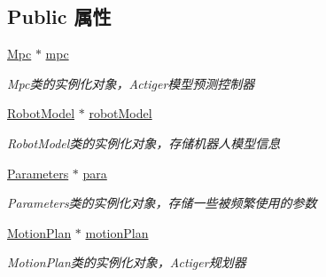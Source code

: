 \subsection*{Public 属性}
\begin{DoxyCompactItemize}
\item 
\mbox{\label{classquadruped_1_1LocomotionCtrl_af2e5cc2d85c00e73c580aebf5b6db19f}} 
\hyperlink{classquadruped_1_1Mpc}{Mpc} $\ast$ \hyperlink{classquadruped_1_1LocomotionCtrl_af2e5cc2d85c00e73c580aebf5b6db19f}{mpc}
\begin{DoxyCompactList}\small\item\em Mpc类的实例化对象，\+Actiger模型预测控制器 \end{DoxyCompactList}\item 
\mbox{\label{classquadruped_1_1LocomotionCtrl_afb4fdfa9aeafca4990b964be1760a291}} 
\hyperlink{classquadruped_1_1RobotModel}{Robot\+Model} $\ast$ \hyperlink{classquadruped_1_1LocomotionCtrl_afb4fdfa9aeafca4990b964be1760a291}{robot\+Model}
\begin{DoxyCompactList}\small\item\em Robot\+Model类的实例化对象，存储机器人模型信息 \end{DoxyCompactList}\item 
\mbox{\label{classquadruped_1_1LocomotionCtrl_a77f83342b1327735db2ce184d032b697}} 
\hyperlink{classquadruped_1_1Parameters}{Parameters} $\ast$ \hyperlink{classquadruped_1_1LocomotionCtrl_a77f83342b1327735db2ce184d032b697}{para}
\begin{DoxyCompactList}\small\item\em Parameters类的实例化对象，存储一些被频繁使用的参数 \end{DoxyCompactList}\item 
\mbox{\label{classquadruped_1_1LocomotionCtrl_a27b80b6c14c2153e3c3ad367d4411805}} 
\hyperlink{classquadruped_1_1MotionPlan}{Motion\+Plan} $\ast$ \hyperlink{classquadruped_1_1LocomotionCtrl_a27b80b6c14c2153e3c3ad367d4411805}{motion\+Plan}
\begin{DoxyCompactList}\small\item\em Motion\+Plan类的实例化对象，\+Actiger规划器 \end{DoxyCompactList}\item 

\end{DoxyCompactItemize}
